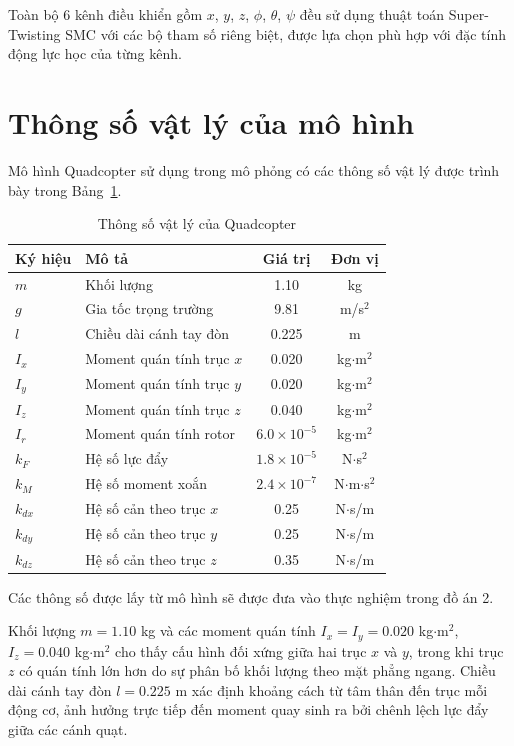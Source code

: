 \documentclass[12pt,a4paper]{report}
\begin{document}
Toàn bộ 6 kênh điều khiển gồm $x$, $y$, $z$, $\phi$, $\theta$, $\psi$ đều sử dụng thuật toán Super-Twisting SMC với các bộ tham số riêng biệt, được lựa chọn phù hợp với đặc tính động lực học của từng kênh.

\section{Thông số vật lý của mô hình}
Mô hình Quadcopter sử dụng trong mô phỏng có các thông số vật lý được trình bày trong Bảng~\ref{tab:physical_params}.

\begin{table}[h!]
\centering
\caption{Thông số vật lý của Quadcopter}
\label{tab:physical_params}
\renewcommand{\arraystretch}{1.3}
\begin{tabular}{|l|l|c|c|}
\hline
Ký hiệu & Mô tả & Giá trị & Đơn vị \\
\hline
$m$ & Khối lượng & 1.10 & kg \\
$g$ & Gia tốc trọng trường & 9.81 & m/s$^2$ \\
$l$ & Chiều dài cánh tay đòn & 0.225 & m \\
$I_x$ & Moment quán tính trục $x$ & 0.020 & kg$\cdot$m$^2$ \\
$I_y$ & Moment quán tính trục $y$ & 0.020 & kg$\cdot$m$^2$ \\
$I_z$ & Moment quán tính trục $z$ & 0.040 & kg$\cdot$m$^2$ \\
$I_r$ & Moment quán tính rotor & $6.0 \times 10^{-5}$ & kg$\cdot$m$^2$ \\
$k_F$ & Hệ số lực đẩy & $1.8 \times 10^{-5}$ & N$\cdot$s$^2$ \\
$k_M$ & Hệ số moment xoắn & $2.4 \times 10^{-7}$ & N$\cdot$m$\cdot$s$^2$ \\
$k_{dx}$ & Hệ số cản theo trục $x$ & 0.25 & N$\cdot$s/m \\
$k_{dy}$ & Hệ số cản theo trục $y$ & 0.25 & N$\cdot$s/m \\
$k_{dz}$ & Hệ số cản theo trục $z$ & 0.35 & N$\cdot$s/m \\
\hline
\end{tabular}
\end{table}

Các thông số được lấy từ mô hình sẽ được đưa vào thực nghiệm trong đồ án 2.

Khối lượng $m = 1.10$ kg và các moment quán tính $I_x = I_y = 0.020$ kg$\cdot$m$^2$, $I_z = 0.040$ kg$\cdot$m$^2$ cho thấy cấu hình đối xứng giữa hai trục $x$ và $y$, trong khi trục $z$ có quán tính lớn hơn do sự phân bố khối lượng theo mặt phẳng ngang. Chiều dài cánh tay đòn $l = 0.225$ m xác định khoảng cách từ tâm thân đến trục mỗi động cơ, ảnh hưởng trực tiếp đến moment quay sinh ra bởi chênh lệch lực đẩy giữa các cánh quạt.
\end{document}
